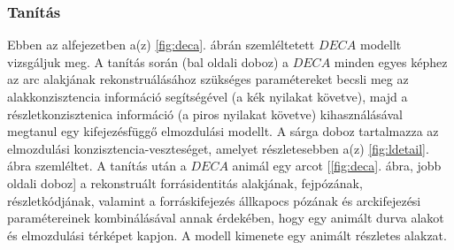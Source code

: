 \documentclass[12pt,a4]{article}
\begin{document}
            \subsubsection{Tanítás}
                Ebben az alfejezetben a(z) \ref{fig:deca}. ábrán szemléltetett $DECA$ modellt vizsgáljuk meg.
     	          A tanítás során (bal oldali doboz) a $DECA$ minden egyes képhez
     	          az arc alakjának rekonstruálásához szükséges paramétereket becsli meg az
     	          alakkonzisztencia információ segítségével (a kék nyilakat követve), majd
     	          a részletkonzisztenica információ (a piros nyilakat követve) kihasználásával
     	          megtanul egy kifejezésfüggő elmozdulási modellt. A sárga doboz tartalmazza
     	          az elmozdulási konzisztencia-veszteséget, amelyet részletesebben
                a(z) \ref{fig:ldetail}. ábra szemléltet.
     	          A tanítás után a $DECA$ animál egy arcot [\ref{fig:deca}. ábra, 
                jobb oldali doboz] a rekonstruált forrásidentitás alakjának, fejpózának, részletkódjának, valamint a forráskifejezés állkapocs pózának és arckifejezési paramétereinek kombinálásával annak érdekében, hogy egy animált durva alakot és elmozdulási térképet kapjon. A modell kimenete egy animált
     	          részletes alakzat.
\end{document}
